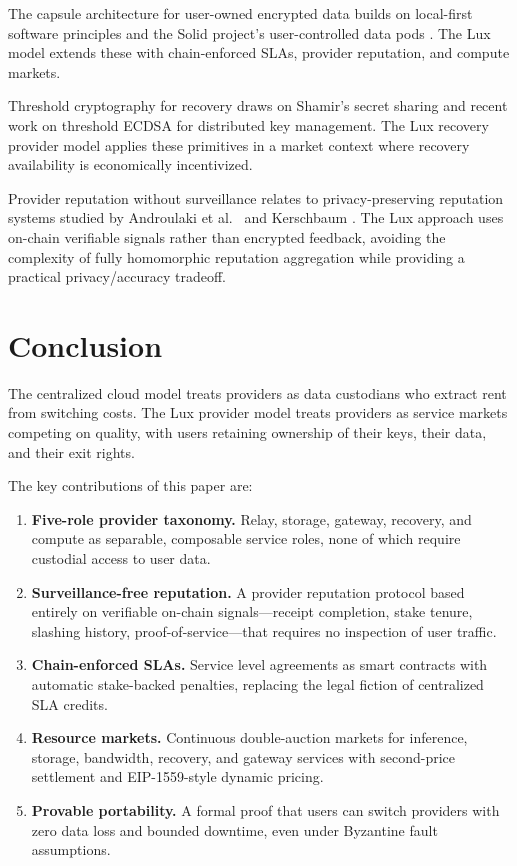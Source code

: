 \documentclass[11pt,a4paper]{article}
\begin{document}
The capsule architecture for user-owned encrypted data builds on
local-first software principles \cite{kleppmann2019localfirst} and
the Solid project's user-controlled data pods \cite{bernerslee2016solid}.
The Lux model extends these with chain-enforced SLAs, provider
reputation, and compute markets.

Threshold cryptography for recovery draws on Shamir's secret sharing
\cite{shamir1979share} and recent work on threshold ECDSA
\cite{gennaro2020frost} for distributed key management. The Lux
recovery provider model applies these primitives in a market context
where recovery availability is economically incentivized.

Provider reputation without surveillance relates to privacy-preserving
reputation systems studied by Androulaki et al.\ \cite{androulaki2008reputation}
and Kerschbaum \cite{kerschbaum2009reputation}. The Lux approach uses
on-chain verifiable signals rather than encrypted feedback, avoiding
the complexity of fully homomorphic reputation aggregation while
providing a practical privacy/accuracy tradeoff.

\section{Conclusion}\label{sec:conclusion}

The centralized cloud model treats providers as data custodians who
extract rent from switching costs. The Lux provider model treats
providers as service markets competing on quality, with users retaining
ownership of their keys, their data, and their exit rights.

The key contributions of this paper are:

\begin{enumerate}
    \item \textbf{Five-role provider taxonomy.} Relay, storage, gateway,
    recovery, and compute as separable, composable service roles, none of
    which require custodial access to user data.

    \item \textbf{Surveillance-free reputation.} A provider reputation
    protocol based entirely on verifiable on-chain signals---receipt
    completion, stake tenure, slashing history, proof-of-service---that
    requires no inspection of user traffic.

    \item \textbf{Chain-enforced SLAs.} Service level agreements as smart
    contracts with automatic stake-backed penalties, replacing the legal
    fiction of centralized SLA credits.

    \item \textbf{Resource markets.} Continuous double-auction markets
    for inference, storage, bandwidth, recovery, and gateway services
    with second-price settlement and EIP-1559-style dynamic pricing.

    \item \textbf{Provable portability.} A formal proof that users can
    switch providers with zero data loss and bounded downtime, even under
    Byzantine fault assumptions.
\end{enumerate}
\end{document}
